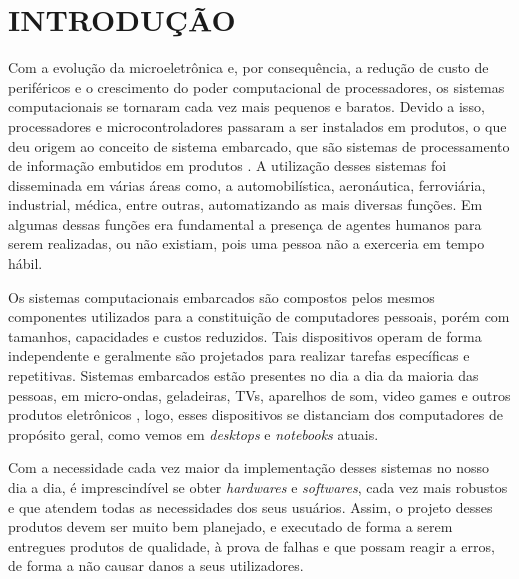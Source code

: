 
\chapter{INTRODUÇÃO}
\label{chap:introducao}
Com a evolução da microeletrônica e, por consequência, a redução de custo de periféricos e o crescimento do poder computacional de processadores, os sistemas computacionais se tornaram cada vez mais pequenos e baratos. Devido a isso, processadores e microcontroladores passaram a ser instalados em produtos, o que deu origem ao conceito de sistema embarcado, que são sistemas de processamento de informação embutidos em produtos \cite{Marwedel2006}.
A utilização desses sistemas foi disseminada em várias áreas como, a automobilística, aeronáutica, ferroviária, industrial, médica, entre outras, automatizando as mais diversas funções. Em algumas dessas funções era fundamental a presença de agentes humanos para serem realizadas, ou não existiam, pois uma pessoa não a exerceria em tempo hábil.



Os sistemas computacionais embarcados são compostos pelos mesmos componentes utilizados para a constituição de computadores pessoais, porém com tamanhos, capacidades e custos reduzidos. Tais dispositivos operam de forma independente e geralmente são projetados para realizar tarefas específicas e repetitivas. 
Sistemas embarcados estão presentes no dia a dia da maioria das pessoas, em micro-ondas, geladeiras, TVs, aparelhos de som, video games e outros produtos eletrônicos \cite{Marwedel2006}, logo, esses dispositivos se distanciam dos computadores de propósito geral, como vemos em \textit{desktops} e \textit{notebooks} atuais. 




Com a necessidade cada vez maior da implementação desses sistemas no nosso dia a dia, é imprescindível se obter \textit{hardwares} e \textit{softwares}, cada vez mais robustos e que atendem todas as necessidades dos seus usuários.
Assim, o projeto desses produtos devem ser muito bem planejado, e executado de forma a serem entregues produtos de qualidade, à  prova de falhas e que possam reagir a erros, de forma a não causar danos a seus utilizadores. 

